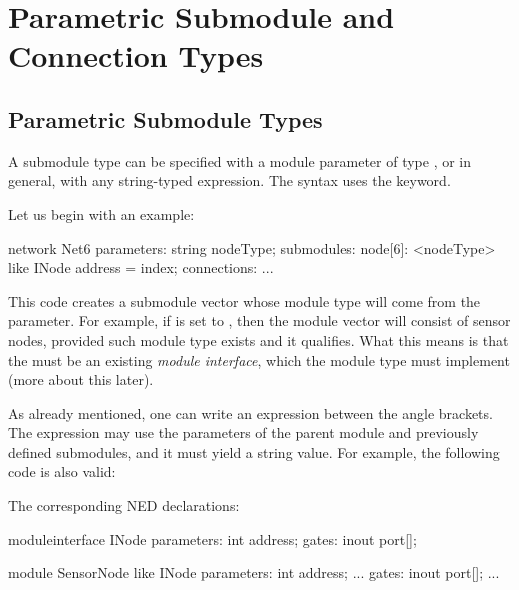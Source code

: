 \section{Parametric Submodule and Connection Types}
\label{sec:ned-lang:parametric-submodule-and-connection-types}

\subsection{Parametric Submodule Types}
\label{sec:ned-lang:submodule-like}

A submodule type can be specified with a module parameter of type
, or in general, with any string-typed expression. The syntax
uses the  keyword.

Let us begin with an example:

\begin{ned}
network Net6
{
    parameters:
        string nodeType;
    submodules:
        node[6]: <nodeType> like INode {
            address = index;
        }
    connections:
        ...
}
\end{ned}

This code creates a submodule vector whose module type will come from the
 parameter. For example, if  is set to ,
then the module vector will consist of sensor nodes, provided such module
type exists and it qualifies. What this means is that the  must be
an existing \textit{module interface}, which the 
module type must implement (more about this later).

As already mentioned, one can write an expression between the angle brackets.
The expression may use the parameters of the parent module and previously
defined submodules, and it must yield a string value. For example, the following
code is also valid:

\begin{ned}
network Net6
{
    parameters:
        string nodeTypePrefix;
        int variant;
    submodules:
        node[6]: <nodeTypePrefix + "Node" + string(variant)> like INode {
           ...
}
\end{ned}

The corresponding NED declarations:

\begin{ned}
moduleinterface INode
{
    parameters:
        int address;
    gates:
        inout port[];
}

module SensorNode like INode
{
    parameters:
        int address;
        ...
    gates:
        inout port[];
        ...
}
\end{ned}

